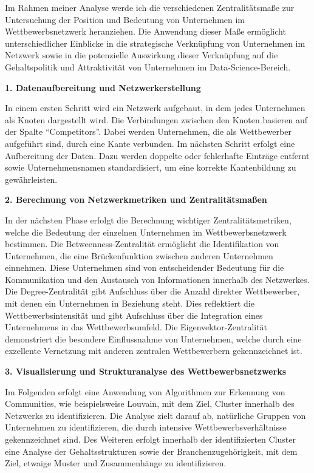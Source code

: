 \documentclass[
]{article}
\begin{document}
Im Rahmen meiner Analyse werde ich die verschiedenen Zentralitätsmaße
zur Untersuchung der Position und Bedeutung von Unternehmen im
Wettbewerbsnetzwerk heranziehen. Die Anwendung dieser Maße ermöglicht
unterschiedlicher Einblicke in die strategische Verknüpfung von
Unternehmen im Netzwerk sowie in die potenzielle Auswirkung dieser
Verknüpfung auf die Gehaltspolitik und Attraktivität von Unternehmen im
Data-Science-Bereich.

\textbf{1. Datenaufbereitung und Netzwerkerstellung}

In einem ersten Schritt wird ein Netzwerk aufgebaut, in dem jedes
Unternehmen als Knoten dargestellt wird. Die Verbindungen zwischen den
Knoten basieren auf der Spalte ``Competitors''. Dabei werden
Unternehmen, die als Wettbewerber aufgeführt sind, durch eine Kante
verbunden. Im nächsten Schritt erfolgt eine Aufbereitung der Daten. Dazu
werden doppelte oder fehlerhafte Einträge entfernt sowie
Unternehmensnamen standardisiert, um eine korrekte Kantenbildung zu
gewährleisten.

\textbf{2. Berechnung von Netzwerkmetriken und Zentralitätsmaßen}

In der nächsten Phase erfolgt die Berechnung wichtiger
Zentralitätsmetriken, welche die Bedeutung der einzelnen Unternehmen im
Wettbewerbsnetzwerk bestimmen. Die Betweenness-Zentralität ermöglicht
die Identifikation von Unternehmen, die eine Brückenfunktion zwischen
anderen Unternehmen einnehmen. Diese Unternehmen sind von entscheidender
Bedeutung für die Kommunikation und den Austausch von Informationen
innerhalb des Netzwerkes. Die Degree-Zentralität gibt Aufschluss über
die Anzahl direkter Wettbewerber, mit denen ein Unternehmen in Beziehung
steht. Dies reflektiert die Wettbewerbsintensität und gibt Aufschluss
über die Integration eines Unternehmens in das Wettbewerbsumfeld. Die
Eigenvektor-Zentralität demonstriert die besondere Einflussnahme von
Unternehmen, welche durch eine exzellente Vernetzung mit anderen
zentralen Wettbewerbern gekennzeichnet ist.

\textbf{3. Visualisierung und Strukturanalyse des Wettbewerbsnetzwerks}

Im Folgenden erfolgt eine Anwendung von Algorithmen zur Erkennung von
Communities, wie beispielsweise Louvain, mit dem Ziel, Cluster innerhalb
des Netzwerks zu identifizieren. Die Analyse zielt darauf ab, natürliche
Gruppen von Unternehmen zu identifizieren, die durch intensive
Wettbewerbsverhältnisse gekennzeichnet sind. Des Weiteren erfolgt
innerhalb der identifizierten Cluster eine Analyse der Gehaltsstrukturen
sowie der Branchenzugehörigkeit, mit dem Ziel, etwaige Muster und
Zusammenhänge zu identifizieren.
\end{document}
